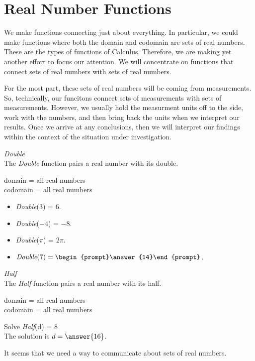 \documentclass{ximera}
\begin{document}
\section{Real Number Functions}

We make functions connecting just about everything.  In particular, we could make functions where both the domain and codomain are sets of real numbers. These are the types of functions of Calculus.  Therefore, we are making yet another effort to focus our attention.  We will concentrate on functions that connect sets of real numbers with sets of real numbers.

For the most part, these sets of real numbers will be coming from measurements.  So, technically, our funcitons connect sets of measurements with sets of measurements. However, we usually hold the measurment units off to the side, work with the numbers, and then bring back the units when we interpret our results.  Once we arrive at any conclusions, then we will interpret our findings within the context of the situation under investigation.




\begin{question} \textit{Double} \\
The \textit{Double} function pairs a real number with its double.

domain = all real numbers  \\ 
codomain = all real numbers


\begin{itemize}
\item \textit{Double}($3$) = $6$.
\item \textit{Double}($-4$) = $-8$.
\item \textit{Double}($\pi$) = $2 \pi$.

\item $\textit{Double}(7) = \begin{prompt}\answer{14}\end{prompt}$.
\end{itemize}

\end{question} 



\begin{question} \textit{Half} \\
The \textit{Half} function pairs a real number with its half.

domain = all real numbers  \\ 
codomain = all real numbers


Solve \textit{Half}(d) = $8$ \\

The solution is $d = \answer{16}$.

\end{question} 


It seems that we need a way to communicate about sets of real numbers.
\end{document}
